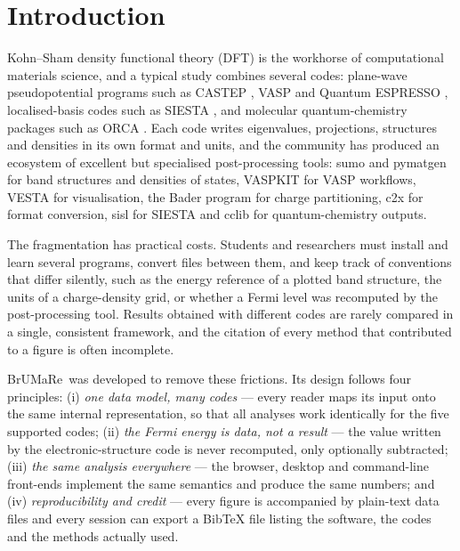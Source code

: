 \documentclass[11pt,a4paper]{article}
\newcommand{\BMR}{\textsf{BrUMa\textcolor[HTML]{B26B00}{Re}}}
\begin{document}
\section{Introduction}
Kohn–Sham density functional theory (DFT) \cite{hohenberg1964,kohn1965} is the workhorse of computational materials science, and a typical study combines several codes: plane-wave pseudopotential programs such as CASTEP \cite{clark2005castep}, VASP \cite{kresse1996vasp} and Quantum ESPRESSO \cite{giannozzi2009,giannozzi2017}, localised-basis codes such as SIESTA \cite{soler2002siesta}, and molecular quantum-chemistry packages such as ORCA \cite{neese2020}. Each code writes eigenvalues, projections, structures and densities in its own format and units, and the community has produced an ecosystem of excellent but specialised post-processing tools: sumo \cite{ganose2018sumo} and pymatgen \cite{ong2013pymatgen} for band structures and densities of states, VASPKIT \cite{wang2021vaspkit} for VASP workflows, VESTA \cite{momma2011vesta} for visualisation, the Bader program \cite{henkelman2006,tang2009bader} for charge partitioning, c2x \cite{rutter2018c2x} for format conversion, sisl for SIESTA and cclib \cite{oboyle2008cclib} for quantum-chemistry outputs.

The fragmentation has practical costs. Students and researchers must install and learn several programs, convert files between them, and keep track of conventions that differ silently, such as the energy reference of a plotted band structure, the units of a charge-density grid, or whether a Fermi level was recomputed by the post-processing tool. Results obtained with different codes are rarely compared in a single, consistent framework, and the citation of every method that contributed to a figure is often incomplete.

\BMR\ was developed to remove these frictions. Its design follows four principles: (i) \emph{one data model, many codes} — every reader maps its input onto the same internal representation, so that all analyses work identically for the five supported codes; (ii) \emph{the Fermi energy is data, not a result} — the value written by the electronic-structure code is never recomputed, only optionally subtracted; (iii) \emph{the same analysis everywhere} — the browser, desktop and command-line front-ends implement the same semantics and produce the same numbers; and (iv) \emph{reproducibility and credit} — every figure is accompanied by plain-text data files and every session can export a BibTeX file listing the software, the codes and the methods actually used.
\end{document}
